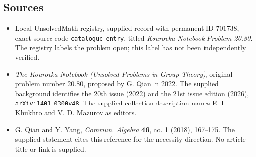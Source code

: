 \documentclass[11pt]{article}
\begin{document}
\subsection{Sources}
\begin{itemize}
\item Local UnsolvedMath registry, supplied record with permanent ID \(701738\), exact source code \texttt{catalogue entry}, titled \emph{Kourovka Notebook Problem 20.80}. The registry labels the problem open; this label has not been independently verified.
\item \emph{The Kourovka Notebook (Unsolved Problems in Group Theory)}, original problem number 20.80, proposed by G. Qian in 2022. The supplied background identifies the 20th issue (2022) and the 21st issue edition (2026), \texttt{arXiv:1401.0300v48}. The supplied collection description names E. I. Khukhro and V. D. Mazurov as editors.
\item G. Qian and Y. Yang, \emph{Commun. Algebra} \textbf{46}, no. 1 (2018), 167--175. The supplied statement cites this reference for the necessity direction. No article title or link is supplied.
\end{itemize}
\end{document}
